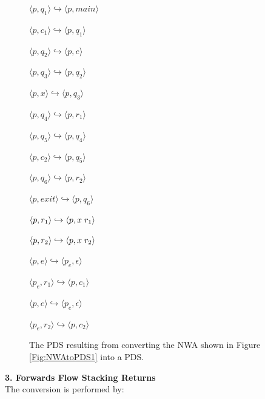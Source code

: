 \begin{figure}[htbp]
  \centering
    \begin{description}
      \centering
      \item $\langle p,q_1 \rangle \hookrightarrow \langle p,main \rangle$
      \item $\langle p,c_1 \rangle \hookrightarrow \langle p,q_1 \rangle$
      \item $\langle p,q_2 \rangle \hookrightarrow \langle p,e \rangle$
      \item $\langle p,q_3 \rangle \hookrightarrow \langle p,q_2 \rangle$
      \item $\langle p,x \rangle \hookrightarrow \langle p,q_3 \rangle$
      \item $\langle p,q_4 \rangle \hookrightarrow \langle p,r_1 \rangle$
      \item $\langle p,q_5 \rangle \hookrightarrow \langle p,q_4 \rangle$
      \item $\langle p,c_2 \rangle \hookrightarrow \langle p,q_5 \rangle$
      \item $\langle p,q_6 \rangle \hookrightarrow \langle p,r_2 \rangle$
      \item $\langle p,exit \rangle \hookrightarrow \langle p,q_6 \rangle$
      \item $\langle p,r_1 \rangle \hookrightarrow \langle p,x \hspace{.1cm} r_1 \rangle$
      \item $\langle p,r_2 \rangle \hookrightarrow \langle p,x \hspace{.1cm} r_2 \rangle$
      \item $\langle p,e \rangle \hookrightarrow \langle p_e, \epsilon \rangle$
      \item $\langle p_e,r_1 \rangle \hookrightarrow \langle p,c_1 \rangle$
      \item $\langle p,e \rangle \hookrightarrow \langle p_e, \epsilon \rangle$
      \item $\langle p_e,r_2 \rangle \hookrightarrow \langle p,c_2 \rangle$
    \end{description}
  \caption{The PDS resulting from converting the NWA shown in Figure \ref{Fig:NWAtoPDS1} into a PDS.}
  \label{Fig:NWAtoPDS5}
\end{figure}

\noindent \textbf{3. Forwards Flow Stacking Returns} \\

\noindent The conversion is performed by:

